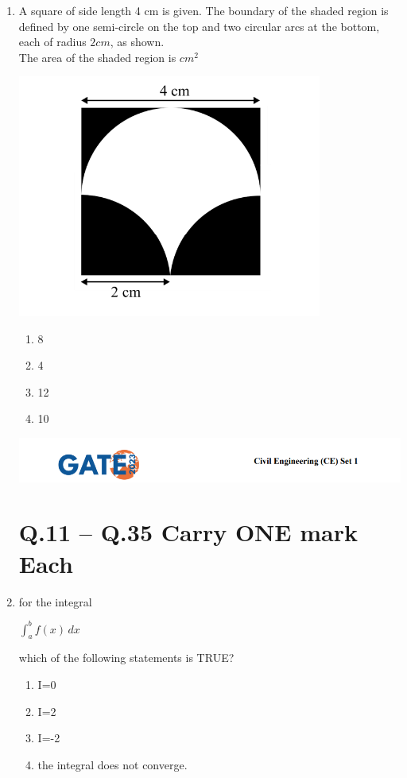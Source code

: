 \documentclass[journal,14pt,onecolumn]{IEEEtran}
\theoremstyle{remark}
\begin{document}
\begin{enumerate}[label={Q\arabic*.}]
\item A square of side length 4 cm is given. The boundary of the shaded region is defined by one semi-circle on the top and two circular arcs at the bottom, each of radius $2 cm$, as shown.\\
The area of the shaded region is \underline{\hspace{2cm}}$cm^2$

\includegraphics[width=10cm]{pics/Screenshot 2025-08-02 131031.png}
\begin{enumerate}
    \item 8
    \item 4
    \item 12
    \item 10
\end{enumerate}

\newpage

\includegraphics[width=\textwidth]{pics/header.png}
\section*{Q.11 – Q.35 Carry ONE mark Each}
\vspace{1cm}

\item for the integral \\
\begin{center}
    \Large\textbf{$\int_{a}^{b} f(x) \,dx$}
\end{center}
\vspace{0.5cm}
which of the following statements is TRUE?
\begin{enumerate}
    \item I=0
    \item I=2
    \item I=-2
    \item the integral does not converge.
\end{enumerate}
\vspace{1cm}


\end{enumerate}
\end{document}
